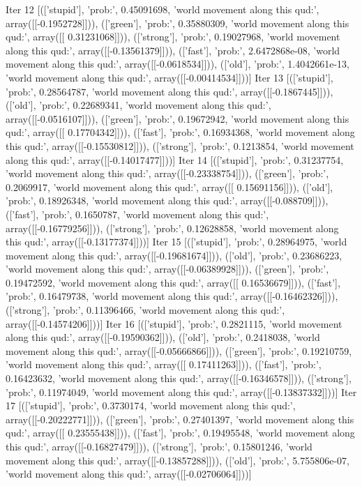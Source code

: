 Iter 12 [(['stupid'], 'prob:', 0.45091698, 'world movement along this qud:', array([[-0.1952728]])), (['green'], 'prob:', 0.35880309, 'world movement along this qud:', array([[ 0.31231068]])), (['strong'], 'prob:', 0.19027968, 'world movement along this qud:', array([[-0.13561379]])), (['fast'], 'prob:', 2.6472868e-08, 'world movement along this qud:', array([[-0.0618534]])), (['old'], 'prob:', 1.4042661e-13, 'world movement along this qud:', array([[-0.00414534]]))]
Iter 13 [(['stupid'], 'prob:', 0.28564787, 'world movement along this qud:', array([[-0.1867445]])), (['old'], 'prob:', 0.22689341, 'world movement along this qud:', array([[-0.0516107]])), (['green'], 'prob:', 0.19672942, 'world movement along this qud:', array([[ 0.17704342]])), (['fast'], 'prob:', 0.16934368, 'world movement along this qud:', array([[-0.15530812]])), (['strong'], 'prob:', 0.1213854, 'world movement along this qud:', array([[-0.14017477]]))]
Iter 14 [(['stupid'], 'prob:', 0.31237754, 'world movement along this qud:', array([[-0.23338754]])), (['green'], 'prob:', 0.2069917, 'world movement along this qud:', array([[ 0.15691156]])), (['old'], 'prob:', 0.18926348, 'world movement along this qud:', array([[-0.088709]])), (['fast'], 'prob:', 0.1650787, 'world movement along this qud:', array([[-0.16779256]])), (['strong'], 'prob:', 0.12628858, 'world movement along this qud:', array([[-0.13177374]]))]
Iter 15 [(['stupid'], 'prob:', 0.28964975, 'world movement along this qud:', array([[-0.19681674]])), (['old'], 'prob:', 0.23686223, 'world movement along this qud:', array([[-0.06389928]])), (['green'], 'prob:', 0.19472592, 'world movement along this qud:', array([[ 0.16536679]])), (['fast'], 'prob:', 0.16479738, 'world movement along this qud:', array([[-0.16462326]])), (['strong'], 'prob:', 0.11396466, 'world movement along this qud:', array([[-0.14574206]]))]
Iter 16 [(['stupid'], 'prob:', 0.2821115, 'world movement along this qud:', array([[-0.19590362]])), (['old'], 'prob:', 0.2418038, 'world movement along this qud:', array([[-0.05666866]])), (['green'], 'prob:', 0.19210759, 'world movement along this qud:', array([[ 0.17411263]])), (['fast'], 'prob:', 0.16423632, 'world movement along this qud:', array([[-0.16346578]])), (['strong'], 'prob:', 0.11974049, 'world movement along this qud:', array([[-0.13837332]]))]
Iter 17 [(['stupid'], 'prob:', 0.3730174, 'world movement along this qud:', array([[-0.20222771]])), (['green'], 'prob:', 0.27401397, 'world movement along this qud:', array([[ 0.23555438]])), (['fast'], 'prob:', 0.19495548, 'world movement along this qud:', array([[-0.16827479]])), (['strong'], 'prob:', 0.15801246, 'world movement along this qud:', array([[-0.13857288]])), (['old'], 'prob:', 5.755806e-07, 'world movement along this qud:', array([[-0.02706064]]))]
